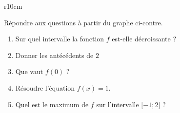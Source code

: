 
\begin{exercice}\label{exosmath-0516}

\begin{wrapfigure}{r}{10cm}
   \vspace{-1cm}        %
   \centering
   
\end{wrapfigure}

    Répondre aux questions à partir du graphe ci-contre.
    \begin{enumerate}
        \item
            Sur quel intervalle la fonction \( f\) est-elle décroissante ?
        \item
            Donner les antécédents de \( 2\)
        \item
            Que vaut \( f(0)\) ?
        \item
            Résoudre l'équation \( f(x)=1\).
        \item
            Quel est le maximum de \( f\) sur l'intervalle \( \mathopen[ -1 ; 2 \mathclose]\) ?
    \end{enumerate}

\end{exercice}
